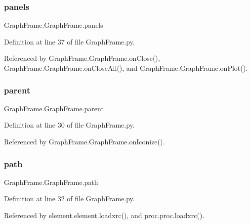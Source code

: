 \subsubsection{\texorpdfstring{panels}{panels}}
{\footnotesize\ttfamily Graph\+Frame.\+Graph\+Frame.\+panels}



Definition at line 37 of file Graph\+Frame.\+py.



Referenced by Graph\+Frame.\+Graph\+Frame.\+on\+Close(), Graph\+Frame.\+Graph\+Frame.\+on\+Close\+All(), and Graph\+Frame.\+Graph\+Frame.\+on\+Plot().

\mbox{\label{classGraphFrame_1_1GraphFrame_a2e037073bd21eb4b1ce33d0763c553ac}} 
\subsubsection{\texorpdfstring{parent}{parent}}
{\footnotesize\ttfamily Graph\+Frame.\+Graph\+Frame.\+parent}



Definition at line 30 of file Graph\+Frame.\+py.



Referenced by Graph\+Frame.\+Graph\+Frame.\+on\+Iconize().

\mbox{\label{classGraphFrame_1_1GraphFrame_ae056809f5cf0d296c53738e7b7965fbd}} 
\subsubsection{\texorpdfstring{path}{path}}
{\footnotesize\ttfamily Graph\+Frame.\+Graph\+Frame.\+path}



Definition at line 32 of file Graph\+Frame.\+py.



Referenced by element.\+element.\+loadxrc(), and proc.\+proc.\+loadxrc().

\mbox{\label{classGraphFrame_1_1GraphFrame_a8adc9094b9ee3ef5bfd446cc6b1b335c}} 
